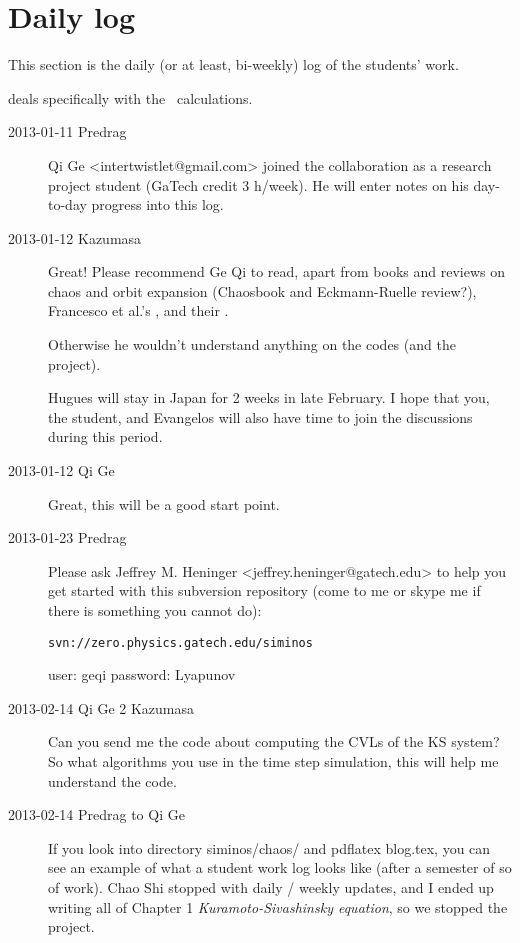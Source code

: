 \section{Daily log}

This section is the daily (or at least, bi-weekly)  log of the students'
work.

 deals specifically with the \KS\ calculations.


\begin{description}

\item[2013-01-11 Predrag] Qi Ge  <intertwistlet@gmail.com> joined the
collaboration as a research project student (GaTech credit 3 h/week).
He will enter notes on his day-to-day progress into this log.

\item[2013-01-12 Kazumasa]
Great! Please recommend Ge Qi to read, apart from books and reviews on
chaos and orbit expansion (Chaosbook and Eckmann-Ruelle review?),
Francesco et al.'s
, and their
.

Otherwise he wouldn't understand anything on the codes (and the project).

Hugues will stay in Japan for 2 weeks in late February. I hope that you,
the student, and Evangelos will also have time to join the discussions
during this period.

\item[2013-01-12 Qi Ge]
Great, this will be a good start point.

\item[2013-01-23 Predrag] Please ask Jeffrey M. Heninger
<jeffrey.heninger@gatech.edu> to help you get started with this
subversion repository (come to me or skype me if there is something you
cannot do):

\texttt{svn://zero.physics.gatech.edu/siminos}

user: geqi  password: Lyapunov

\item[2013-02-14 Qi Ge 2 Kazumasa]
Can you send me the code about computing the CVLs of the KS system?
So what algorithms you use in the time step simulation, this will
help me understand the code.

\item[2013-02-14 Predrag to Qi Ge] If you look into directory
siminos/chaos/ and pdflatex blog.tex, you can see an example of what
a student work log looks like (after a semester of so of work). Chao
Shi stopped with daily / weekly updates, and I ended up writing all
of Chapter 1 {\em Kuramoto-Sivashinsky equation}, so we stopped the
project.


\end{description}
